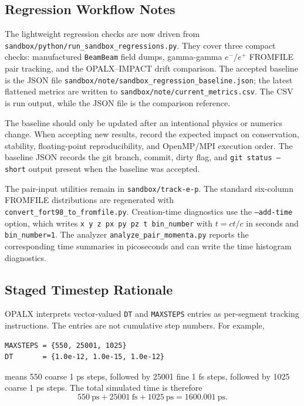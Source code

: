\documentclass[11pt]{article}
\numberwithin{equation}{section}
\begin{document}
\subsection{Regression Workflow Notes}

The lightweight regression checks are now driven from
\texttt{sandbox/python/run\_sandbox\_regressions.py}.  They cover three compact
checks: manufactured \texttt{BeamBeam} field dumps, gamma-gamma
\(e^-/e^+\) FROMFILE pair tracking, and the OPALX--IMPACT drift comparison.
The accepted baseline is the JSON file
\texttt{sandbox/note/sandbox\_regression\_baseline.json}; the latest flattened
metrics are written to \texttt{sandbox/note/current\_metrics.csv}.  The CSV is
run output, while the JSON file is the comparison reference.

The baseline should only be updated after an intentional physics or numerics
change.  When accepting new results, record the expected impact on conservation,
stability, floating-point reproducibility, and OpenMP/MPI execution order.  The
baseline JSON records the git branch, commit, dirty flag, and
\texttt{git status --short} output present when the baseline was accepted.

The pair-input utilities remain in \texttt{sandbox/track-e-p}.  The standard
six-column FROMFILE distributions are regenerated with
\texttt{convert\_fort98\_to\_fromfile.py}.  Creation-time diagnostics use the
\texttt{--add-time} option, which writes
\texttt{x y z px py pz t bin\_number} with \(t=ct/c\) in seconds and
\texttt{bin\_number=1}.  The analyzer
\texttt{analyze\_pair\_momenta.py} reports the corresponding time summaries in
picoseconds and can write the time histogram diagnostics.

\subsection{Staged Timestep Rationale}

OPALX interprets vector-valued \texttt{DT} and \texttt{MAXSTEPS} entries as
per-segment tracking instructions.  The entries are not cumulative step
numbers.  For example,
\begin{verbatim}
MAXSTEPS = {550, 25001, 1025}
DT       = {1.0e-12, 1.0e-15, 1.0e-12}
\end{verbatim}
means 550 coarse 1 ps steps, followed by 25001 fine 1 fs steps, followed by
1025 coarse 1 ps steps.  The total simulated time is therefore
\begin{equation}
  550~\mathrm{ps} + 25001~\mathrm{fs} + 1025~\mathrm{ps}
  = 1600.001~\mathrm{ps}.
\end{equation}
\end{document}
